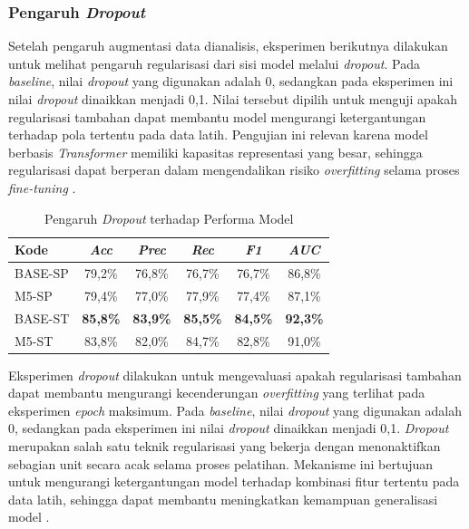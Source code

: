 \subsubsection{Pengaruh \textit{Dropout}} \label{IV.Eksperimen_Ablation_Dropout}
Setelah pengaruh augmentasi data dianalisis, eksperimen berikutnya dilakukan untuk melihat pengaruh regularisasi dari sisi model melalui \textit{dropout}. Pada \textit{baseline}, nilai \textit{dropout} yang digunakan adalah 0, sedangkan pada eksperimen ini nilai \textit{dropout} dinaikkan menjadi 0,1. Nilai tersebut dipilih untuk menguji apakah regularisasi tambahan dapat membantu model mengurangi ketergantungan terhadap pola tertentu pada data latih. Pengujian ini relevan karena model berbasis \textit{Transformer} memiliki kapasitas representasi yang besar, sehingga regularisasi dapat berperan dalam mengendalikan risiko \textit{overfitting} selama proses \textit{fine-tuning} \cite{JMLR:v15:srivastava14a}.

\begin{table}[htbp]
\centering
\caption{Pengaruh \textit{Dropout} terhadap Performa Model}
\label{table:4.ablation-dropout}
\begin{tabular}{lccccc}
\toprule
\textbf{Kode} &
\textbf{\textit{Acc}} &
\textbf{\textit{Prec}} &
\textbf{\textit{Rec}} &
\textbf{\textit{F1}} &
\textbf{\textit{AUC}} \\
\midrule
BASE-SP & 79,2\% & 76,8\% & 76,7\% & 76,7\% & 86,8\% \\
M5-SP & 79,4\% & 77,0\% & 77,9\% & 77,4\% & 87,1\% \\
\midrule
BASE-ST & \textbf{85,8\%} & \textbf{83,9\%} & \textbf{85,5\%} & \textbf{84,5\%} & \textbf{92,3\%} \\
M5-ST & 83,8\% & 82,0\% & 84,7\% & 82,8\% & 91,0\% \\
\bottomrule
\end{tabular}
\end{table}

Eksperimen \textit{dropout} dilakukan untuk mengevaluasi apakah regularisasi tambahan dapat membantu mengurangi kecenderungan \textit{overfitting} yang terlihat pada eksperimen \textit{epoch} maksimum. Pada \textit{baseline}, nilai \textit{dropout} yang digunakan adalah 0, sedangkan pada eksperimen ini nilai \textit{dropout} dinaikkan menjadi 0,1. \textit{Dropout} merupakan salah satu teknik regularisasi yang bekerja dengan menonaktifkan sebagian unit secara acak selama proses pelatihan. Mekanisme ini bertujuan untuk mengurangi ketergantungan model terhadap kombinasi fitur tertentu pada data latih, sehingga dapat membantu meningkatkan kemampuan generalisasi model \cite{JMLR:v15:srivastava14a}.

